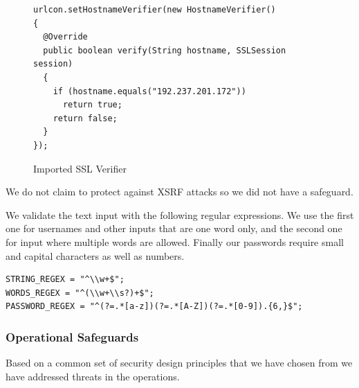 \documentclass[a4paper]{article}
\begin{document}
\begin{figure}[h!]
\caption{Imported SSL Verifier}
\label{fig:ssl_verifier}   
\begin{lstlisting}
urlcon.setHostnameVerifier(new HostnameVerifier()
{
  @Override
  public boolean verify(String hostname, SSLSession session)
  {
    if (hostname.equals("192.237.201.172"))
      return true;
    return false;
  }
});
\end{lstlisting}
\end{figure}







We do not claim to protect against XSRF attacks so we did not have a safeguard.

We validate the text input with the following regular expressions. We use the first one for usernames and other inputs that are one word only, and the second one for input where multiple words are allowed. Finally our passwords require small and capital characters as well as numbers.
\begin{verbatim}
STRING_REGEX = "^\\w+$";
WORDS_REGEX = "^(\\w+\\s?)+$";
PASSWORD_REGEX = "^(?=.*[a-z])(?=.*[A-Z])(?=.*[0-9]).{6,}$";
\end{verbatim}

\subsubsection{Operational Safeguards}
Based on a common set of security design principles \cite{princ} that we have chosen from we have addressed threats in the operations.
\end{document}
